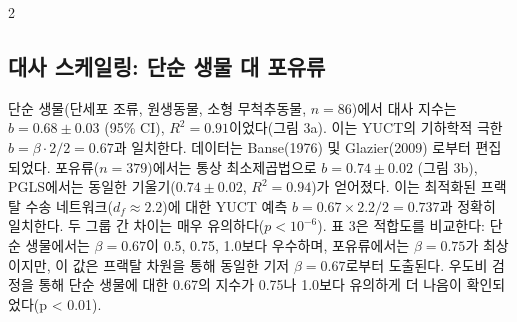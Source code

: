 \documentclass[11pt,a4paper]{article}
\newcommand{\betaf}{\beta}
\newcommand{\df}{d_f}
\begin{document}
\begin{multicols}{2}
		\subsection{대사 스케일링: 단순 생물 대 포유류}
		
		단순 생물(단세포 조류, 원생동물, 소형 무척추동물, \(n = 86\))에서 대사 지수는 \(b = 0.68 \pm 0.03\) (95\% CI), \(R^2 = 0.91\)이었다(그림 3a). 이는 YUCT의 기하학적 극한 \(b = \betaf \cdot 2/2 = 0.67\)과 일치한다. 데이터는 Banse(1976) \cite{Banse1976} 및 Glazier(2009) \cite{Glazier2009}로부터 편집되었다. 포유류(\(n = 379\))에서는 통상 최소제곱법으로 \(b = 0.74 \pm 0.02\) (그림 3b), PGLS에서는 동일한 기울기(\(0.74 \pm 0.02\), \(R^2 = 0.94\))가 얻어졌다. 이는 최적화된 프랙탈 수송 네트워크(\(\df \approx 2.2\))에 대한 YUCT 예측 \(b = 0.67 \times 2.2 / 2 = 0.737\)과 정확히 일치한다. 두 그룹 간 차이는 매우 유의하다(\(p < 10^{-6}\)). 표 3은 적합도를 비교한다: 단순 생물에서는 \(\beta = 0.67\)이 0.5, 0.75, 1.0보다 우수하며, 포유류에서는 \(\beta = 0.75\)가 최상이지만, 이 값은 프랙탈 차원을 통해 동일한 기저 \(\beta = 0.67\)로부터 도출된다. 우도비 검정을 통해 단순 생물에 대한 0.67의 지수가 0.75나 1.0보다 유의하게 더 나음이 확인되었다(p < 0.01).
		

\end{multicols}
\end{document}
